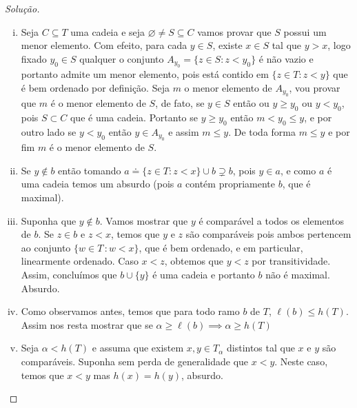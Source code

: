\documentclass[a4paper]{article}
\theoremstyle{plain}\newtheorem{teo}{Teorema}[section]
\theoremstyle{plain}\newtheorem{prop}[teo]{Proposição}
\theoremstyle{plain}\newtheorem{lem}[teo]{Lema}
\theoremstyle{plain}\newtheorem{cor}[teo]{Corolário}
\theoremstyle{definition}\newtheorem{defi}[teo]{Definição}
\theoremstyle{remark}\newtheorem{rem}[teo]{Observação}
\theoremstyle{definition}\newtheorem{example}[teo]{Exemplo}
\theoremstyle{remark}\newtheorem{step}{\bf Step}
\begin{document}
  \begin{proof}[Solução]\hfill
    \begin{enumerate}[(i)]
      \item  Seja \(C\subseteq T\) uma cadeia e seja
        \(\varnothing\not = S\subseteq C\) vamos provar que \(S\) possui um menor
        elemento. Com efeito, para cada \(y\in S\), existe \(x\in S\) tal que \(y >x\), logo fixado $y_0\in S$ qualquer o conjunto $A_{y_0} =\{z\in S: z<y_{0}\}$ é não vazio e portanto admite um menor elemento, pois está contido em $\{z\in T: z<y\}$ que é bem ordenado por definição. Seja $m$ o menor elemento de $A_{y_0}$, vou provar que $m$ é o menor elemento de $S$, de fato, se $y\in S$ então ou $y\geq y_0$ ou $y<y_0$, pois $S\subset C$ que é uma cadeia.
        Portanto se $y\geq y_0$ então $m<y_0\leq y$, e por outro lado se $y<y_0$ então $y\in A_{y_0}$ e assim $m\leq y$. De toda forma $m\leq y$ e por fim $m$ é o menor elemento de $S$.
      \item Se $y\notin b$ então tomando $a\doteq\{z\in T: z<x\}\cup b\supsetneq b$, pois $y\in a$, e como $a$ é uma cadeia temos um absurdo (pois $a$ contém propriamente $b$, que é maximal).
      \item Suponha que \(y\not\in b\). Vamos mostrar que \(y\) é comparável
        a todos os elementos de \(b\). Se \(z\in b\) e \(z < x\), temos que
        \(y\) e \(z\) são comparáveis pois ambos pertencem ao conjunto \(\{w\in
        T\,\colon w< x \}\), que é bem ordenado, e em particular, linearmente
        ordenado. Caso \(x<z\), obtemos que \(y<z\) por transitividade. Assim,
        concluímos que \(b\cup\{y\}\) é uma cadeia e portanto \(b\) não é
        maximal. Absurdo.
      \item Como observamos antes, temos que para
todo ramo \(b\) de \(T\), \(\ell (b)\leq h(T)\). 
Assim nos resta mostrar que se $\alpha\geq \ell (b)\implies \alpha\geq h(T)$ 
        \item Seja \(\alpha < h(T)\) e assuma que existem \(x,y\in T_\alpha\)
          distintos tal que \(x\) e \(y\) são comparáveis.
          Suponha sem perda de generalidade que
      \(x<y\). Neste caso, temos que \(x<y\) mas \(h(x)=h(y)\), absurdo.\qedhere
  \end{enumerate}
  \end{proof}
\end{document}
